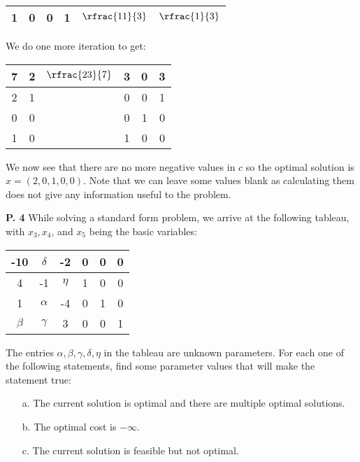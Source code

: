 \documentclass{article}
\begin{document}
\begin{jacklist}
\begin{center}
\begin{tabular}{|c|ccccc|}
            1&0&0&1&$\rfrac{11}{3}$&$\rfrac{1}{3}$\\
            \hline
        \end{tabular}
    \end{center}
    We do one more iteration to get:
    \begin{center}
        \begin{tabular}{|c|ccccc|}
            \hline
            7&2&$\rfrac{23}{7}$&3&0&3\\
            \hline
            2&1&&0&0&1\\
            0&0&&0&1&0\\
            1&0&&1&0&0\\
            \hline
        \end{tabular}
    \end{center}
    We now see that there are no more negative values in $c$ so the optimal solution is $x = (2,0,1,0,0)$. Note that we can leave some
    values blank as calculating them does not give any information useful to the problem. 
\newpage
    \begin{framed} 
    \item [\textbf{P. 4}] While solving a standard form problem, we arrive at the following tableau, with $x_{3}, x_{4}$, and $x_{5}$ 
        being the basic variables: 
        \begin{center}
        \begin{tabular}{|c|ccccc|}
            \hline
            -10 & $\delta$ & -2 & 0 & 0 & 0 \\
            \hline
            4 & -1 & $\eta$ & 1 & 0 & 0 \\
            1 & $\alpha$ & -4 & 0 & 1 & 0 \\
            $\beta$ & $\gamma$ & 3 & 0 & 0 & 1 \\
            \hline
        \end{tabular}
        \end{center}
        The entries $\alpha, \beta, \gamma, \delta, \eta$ in the tableau are unknown parameters. 
        For each one of the following statements, find some parameter values that will make the statement true:
        \begin{itemize}
            \item [a.] The current solution is optimal and there are multiple optimal solutions.
            \item [b.] The optimal cost is $-\infty$.
            \item [c.] The current solution is feasible but not optimal.

\end{itemize}
\end{framed}
\end{jacklist}
\end{document}
